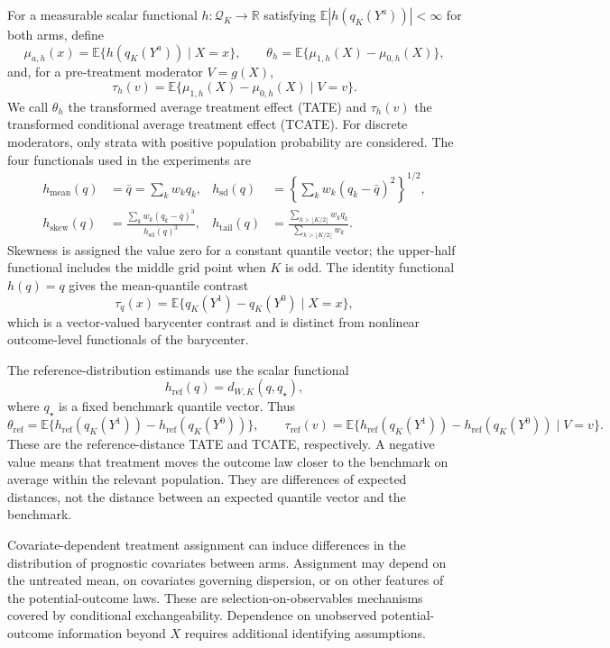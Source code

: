 \documentclass[11pt]{article}
\begin{document}
For a measurable scalar functional $h:\mathcal{Q}_K\to\mathbb{R}$ satisfying $\mathbb{E}|h(q_K(Y^a))|<\infty$ for both arms, define
\[
 \mu_{a,h}(x)=\mathbb{E}\{h(q_K(Y^a))\mid X=x\},\qquad
 \theta_h=\mathbb{E}\{\mu_{1,h}(X)-\mu_{0,h}(X)\},
\]
and, for a pre-treatment moderator $V=g(X)$,
\[
 \tau_h(v)=\mathbb{E}\{\mu_{1,h}(X)-\mu_{0,h}(X)\mid V=v\}.
\]
We call $\theta_h$ the transformed average treatment effect (TATE) and
$\tau_h(v)$ the transformed conditional average treatment effect (TCATE).
For discrete moderators, only strata with positive population probability are considered.
The four functionals used in the experiments are
\begin{align*}
 h_{\mathrm{mean}}(q)&=\bar q=\sum_k w_kq_k,&
 h_{\mathrm{sd}}(q)&=\left\{\sum_k w_k(q_k-\bar q)^2\right\}^{1/2},\\
 h_{\mathrm{skew}}(q)&=\frac{\sum_k w_k(q_k-\bar q)^3}{h_{\mathrm{sd}}(q)^3},&
 h_{\mathrm{tail}}(q)&=\frac{\sum_{k>\lfloor K/2\rfloor}w_kq_k}{\sum_{k>\lfloor K/2\rfloor}w_k}.
\end{align*}
Skewness is assigned the value zero for a constant quantile vector; the upper-half functional includes the middle grid point when $K$ is odd.
The identity
functional $h(q)=q$ gives the mean-quantile contrast
\[
 \tau_q(x)=\mathbb{E}\{q_K(Y^1)-q_K(Y^0)\mid X=x\},
\]
which is a vector-valued barycenter contrast and is distinct from nonlinear
outcome-level functionals of the barycenter.

The reference-distribution estimands use the scalar functional
\[
 h_{\mathrm{ref}}(q)=d_{W,K}(q,q_\star),
\]
where $q_\star$ is a fixed benchmark quantile vector. Thus
\[
 \theta_{\mathrm{ref}}=\mathbb{E}\{h_{\mathrm{ref}}(q_K(Y^1))
 -h_{\mathrm{ref}}(q_K(Y^0))\},\qquad
 \tau_{\mathrm{ref}}(v)=\mathbb{E}\{h_{\mathrm{ref}}(q_K(Y^1))
 -h_{\mathrm{ref}}(q_K(Y^0))\mid V=v\}.
\]
These are the reference-distance TATE and TCATE, respectively. A negative
value means that treatment moves the outcome law closer to the benchmark on
average within the relevant population. They are differences of expected
distances, not the distance between an expected quantile vector and the
benchmark.

Covariate-dependent treatment assignment can induce differences in the distribution of prognostic covariates between arms. Assignment may depend on the untreated mean, on covariates governing dispersion, or on other features of the potential-outcome laws. These are selection-on-observables mechanisms covered by conditional exchangeability. Dependence on unobserved potential-outcome information beyond $X$ requires additional identifying assumptions.
\end{document}
